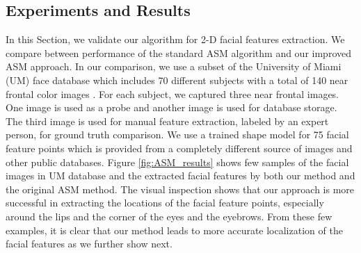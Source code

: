 \subsection{Experiments and Results} \label{Experiments} In this
Section, we validate our algorithm for 2-D facial features
extraction. We compare between performance of the standard ASM
algorithm and our improved ASM approach. In our comparison, we use a
subset of the University of Miami (UM) face database which includes
70 different subjects with a total of 140 near frontal color images
\cite{Nasser07_thesis}. For each subject, we captured three near
frontal images. One image is used as a probe and another image is
used for database storage. The third image is used for manual
feature extraction, labeled by an expert person, for ground truth
comparison. We use a trained shape model for 75 facial feature
points which is provided from a completely different source of
images and other public databases. Figure \ref{fig:ASM_results}
shows few samples of the facial images in UM database and the
extracted facial features by both our method and the original ASM
method. The visual inspection shows that our approach is more
successful in extracting the locations of the facial feature points,
especially around the lips and the corner of the eyes and the
eyebrows. From these few examples, it is clear that our method leads
to more accurate localization of the facial features as we further
show next.
